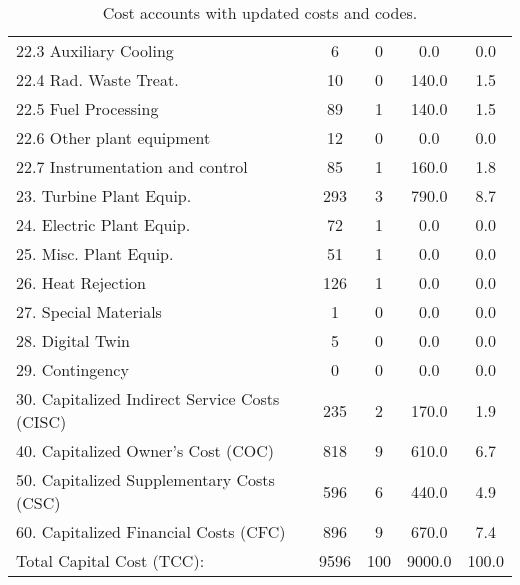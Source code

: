 \begin{table}[h!]
{\begin{tabular}{lcccc}
\hspace{10mm}22.3 Auxiliary Cooling & 6 & 0 & 0.0 & 0.0 \\
\hspace{10mm}22.4 Rad. Waste Treat. & 10 & 0 & 140.0 & 1.5 \\
\hspace{10mm}22.5 Fuel Processing & 89 & 1 & 140.0 & 1.5 \\
\hspace{10mm}22.6 Other plant equipment & 12 & 0 & 0.0 & 0.0 \\
\hspace{10mm}22.7 Instrumentation and control & 85 & 1 & 160.0 & 1.8 \\
\hspace{5mm}23. Turbine Plant Equip. & 293 & 3 & 790.0 & 8.7 \\
\hspace{5mm}24. Electric Plant Equip. & 72 & 1 & 0.0 & 0.0 \\
\hspace{5mm}25. Misc. Plant Equip. & 51 & 1 & 0.0 & 0.0 \\
\hspace{5mm}26. Heat Rejection & 126 & 1 & 0.0 & 0.0 \\
\hspace{5mm}27. Special Materials & 1 & 0 & 0.0 & 0.0 \\
\hspace{5mm}28. Digital Twin & 5 & 0 & 0.0 & 0.0 \\
\hspace{5mm}29. Contingency & 0 & 0 & 0.0 & 0.0 \\
30. Capitalized Indirect Service Costs (CISC) & 235 & 2 & 170.0 & 1.9 \\
40. Capitalized Owner’s Cost (COC) & 818 & 9 & 610.0 & 6.7 \\
50. Capitalized Supplementary Costs (CSC) & 596 & 6 & 440.0 & 4.9 \\
60. Capitalized Financial Costs (CFC) & 896 & 9 & 670.0 & 7.4 \\
\hline
Total Capital Cost (TCC): & 9596 & 100 & 9000.0 & 100.0 \\
\hline
\end{tabular}
}
\caption{Cost accounts with updated costs and codes. }
\label{tab:costsupdatedcodes}
\end{table}


